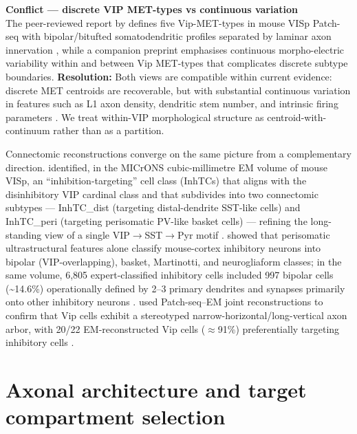 \documentclass[11pt]{article}
\let\origrightarrow\rightarrow
\def\rightarrow{\ensuremath{\origrightarrow}}
\begin{document}
\begin{framed}
\textbf{Conflict --- discrete VIP MET-types vs continuous variation}\\
The peer-reviewed report by \citet{Gouwens2020a} defines five Vip-MET-types in mouse VISp Patch-seq with bipolar/bitufted somatodendritic profiles separated by laminar axon innervation \citep{Gouwens2020a}, while a companion preprint \citep{Gouwens2020b} emphasises continuous morpho-electric variability within and between Vip MET-types that complicates discrete subtype boundaries. \textbf{Resolution:} Both views are compatible within current evidence: discrete MET centroids are recoverable, but with substantial continuous variation in features such as L1 axon density, dendritic stem number, and intrinsic firing parameters \citep{Gouwens2020a, Gouwens2020b, Gliko2024, Chartrand2023}. We treat within-VIP morphological structure as centroid-with-continuum rather than as a partition.
\end{framed}

Connectomic reconstructions converge on the same picture from a complementary direction. \citet{Schneidermizell2025} identified, in the MICrONS cubic-millimetre EM volume of mouse VISp, an ``inhibition-targeting'' cell class (InhTCs) that aligns with the disinhibitory VIP cardinal class and that subdivides into two connectomic subtypes --- InhTC\_dist (targeting distal-dendrite SST-like cells) and InhTC\_peri (targeting perisomatic PV-like basket cells) --- refining the long-standing view of a single VIP\rightarrow SST\rightarrow Pyr motif \citep{Schneidermizell2025, Lee2013, Gamlin2025, Cauli2014}. \citet{Elabbady2025} showed that perisomatic ultrastructural features alone classify mouse-cortex inhibitory neurons into bipolar (VIP-overlapping), basket, Martinotti, and neurogliaform classes; in the same volume, 6,805 expert-classified inhibitory cells included 997 bipolar cells ({\textasciitilde}14.6\%) operationally defined by 2--3 primary dendrites and synapses primarily onto other inhibitory neurons \citep{Elabbady2025, Schneidermizell2025, Gouwens2020a, Gliko2024}. \citet{Gamlin2025} used Patch-seq--EM joint reconstructions to confirm that Vip cells exhibit a stereotyped narrow-horizontal/long-vertical axon arbor, with 20/22 EM-reconstructed Vip cells ($\approx$91\%) preferentially targeting inhibitory cells \citep{Gamlin2025, Schneidermizell2025, Elabbady2025, Lee2013}.

\section{Axonal architecture and target compartment selection}
\end{document}
